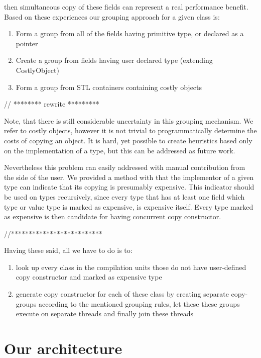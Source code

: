 \documentclass{article}
\begin{document}
then simultaneous copy of these fields can represent a real performance benefit. Based on these experiences our grouping approach for a given class is:
\begin{enumerate}
 \item Form a group from all of the fields having primitive type, or declared as a pointer
 \item Create a group from fields having user declared type (extending CostlyObject)
 \item Form a group from STL containers containing costly objects
\end{enumerate}

// ******** rewrite *********

Note, that there is still considerable uncertainty in this grouping mechanism. We refer to costly objects, however it is not trivial to programmatically determine the costs of copying an object. It is hard, yet possible to create heuristics based only on the implementation of a type, but this can be addressed as future work.

Nevertheless this problem can easily addressed with manual contribution from the side of the user. We provided a method with that the implementor of a given type can indicate that its copying is presumably expensive. This indicator should be used on types recursively, since every type that has at least one field which type or value type is marked as expensive, is expensive itself. Every type marked as expensive is then candidate for having concurrent copy constructor.

//**************************

Having these said, all we have to do is to:
\begin{enumerate}
 \item look up every class in the compilation units those do not have user-defined copy constructor and marked as expensive type
 \item generate copy constructor for each of these class by creating separate copy-groups according to the mentioned grouping rules, let these these groups execute on separate threads and finally join these threads
\end{enumerate}

\section{Our architecture}
\label{architecture}
\end{document}

